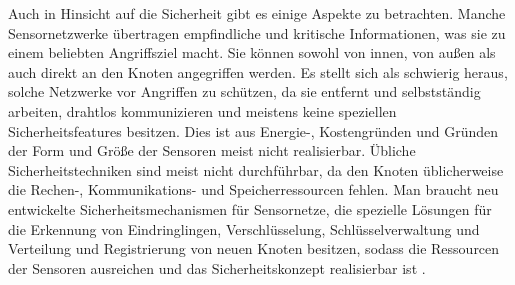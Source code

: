 Auch in Hinsicht auf die Sicherheit gibt es einige Aspekte zu betrachten. Manche Sensornetzwerke übertragen empfindliche und kritische Informationen, was sie zu einem beliebten Angriffsziel macht. Sie können sowohl von innen, von außen als auch direkt an den Knoten angegriffen werden. Es stellt sich als schwierig heraus, solche Netzwerke vor Angriffen zu schützen, da sie entfernt und selbstständig arbeiten, drahtlos kommunizieren und meistens keine speziellen Sicherheitsfeatures besitzen. Dies ist aus Energie-, Kostengründen und Gründen der Form und Größe der Sensoren meist nicht realisierbar. Übliche Sicherheitstechniken sind meist nicht durchführbar, da den Knoten üblicherweise die Rechen-, Kommunikations- und Speicherressourcen fehlen. Man braucht neu entwickelte Sicherheitsmechanismen für Sensornetze, die spezielle Lösungen für die Erkennung von Eindringlingen, Verschlüsselung, Schlüsselverwaltung und Verteilung und Registrierung von neuen Knoten besitzen, sodass die Ressourcen der Sensoren ausreichen und das Sicherheitskonzept realisierbar ist \cite{d:wolf}.